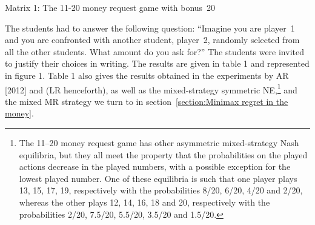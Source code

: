 \begin{Article}
\begin{refsection}[Umbhauer]
\begin{table}[h!]
\centering
Matrix 1: The 11-20 money request game with bonus~20
\label{matx1}
\end{table}

  
The students had to answer the following question: ``Imagine you
are player~1 and you are confronted with another student, player~2,
randomly selected from all the other students. What amount do you ask
for?'' The students were invited to justify their choices in writing.
The results are given in table 1 and represented in figure 1. Table 1
also gives the results obtained in the experiments by AR {[}2012{]} and \textcite{li2018} (LR henceforth), as well as the mixed-strategy
symmetric NE,\footnote{The 11--20 money request game has other
  asymmetric mixed-strategy Nash equilibria, but they all meet the
  property that the probabilities on the played actions decrease in the
  played numbers, with a possible exception for the lowest played
  number. One of these equilibria is such that one player plays 13, 15,
  17, 19, respectively with the probabilities 8/20, 6/20, 4/20 and 2/20,
  whereas the other plays 12, 14, 16, 18 and 20, respectively with the
  probabilities 2/20, 7.5/20, 5.5/20, 3.5/20 and 1.5/20.} and the mixed
MR strategy we turn to in section~\ref{section:Minimax regret in the money}.


\end{refsection}
\end{Article}

